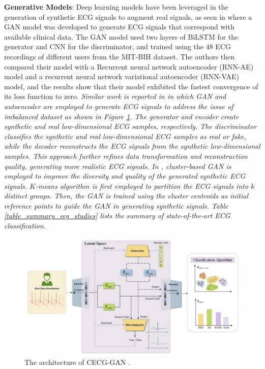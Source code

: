 \documentclass[preprint,12pt]{elsarticle}
\begin{document}
\textbf{Generative Models}: Deep learning models have been leveraged in the generation of synthetic ECG signals to augment real signals, as seen in \citep{zhu_electrocardiogram_2019} where a GAN model was developed to generate ECG signals that correspond with available clinical data. The GAN model used two layers of BiLSTM  for the generator and CNN for the discriminator, and trained using the 48 ECG recordings of different users from the MIT-BIH dataset. The authors then compared their model with a Recurrent neural network autoencoder (RNN-AE) model and a recurrent neural network variational autoencoder (RNN-VAE) model, and the results show that their model exhibited the fastest convergence of its loss function to zero. \emph{Similar work is reported in \citep{yang_data_2024} in which GAN and autoencoder are employed to generate ECG signals to address the issue of imbalanced dataset as shown in Figure \ref{fig_ecg_gan_ae}. The generator and encoder create synthetic and real low-dimensional ECG samples, respectively. The discriminator classifies the synthetic and real low-dimensional ECG samples as real or fake, while the decoder reconstructs the ECG signals from the synthetic low-dimensional samples. This approach further refines data transformation and reconstruction quality, generating more realistic ECG signals. In \citep{msigwa_iot-driven_2024}, cluster-based GAN is employed to improve the diversity and quality of the generated synthetic ECG signals. $K$-means algorithm is first employed to partition the ECG signals into $k$ distinct groups. Then, the GAN is trained using the cluster centroids as initial reference points to guide the GAN in generating synthetic signals. Table \ref{table_summary_ecg_studies} lists the summary of state-of-the-art ECG classification.}

\begin{figure}[h!]
    \centering
    \includegraphics[scale=0.4]{fig_ecg_gan_ae.png}
    \caption{The architecture of CECG-GAN \citep{yang_data_2024}.}
    \label{fig_ecg_gan_ae}
\end{figure}
\end{document}
